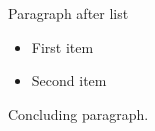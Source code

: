 \documentclass[14pt,t]{beamer}
\begin{document}
\begin{frame}{Paragraph after list}
\begin{itemize}
\item First item
\item Second item
\end{itemize}

Concluding paragraph.
\end{frame}
\end{document}

